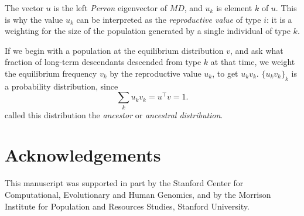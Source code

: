 \documentclass[9pt, a4paper, twocolumn]{extarticle}   	%
\newcommand*{\tr}{^\intercal}
\begin{document}
The vector $u$ is the left \emph{Perron} eigenvector of $MD$, and $u_k$ is element $k$ of $u$.
This is why the value $u_k$ can be interpreted as the \emph{reproductive value} of type $i$: it is a weighting for the size of the population generated by a single individual of type $k$.

If we begin with a population at the equilibrium distribution $v$,
and ask what fraction of long-term descendants descended from type $k$ at that time,
we weight the equilibrium frequency $v_k$ by the reproductive value $u_k$, to get $u_k v_k$.
$\{u_k v_k\}_{k}$ is a probability distribution, since
\begin{equation}
\sum_k {u_k v_k} = u\tr v = 1.
\end{equation}
\citet{Hermisson2002} called this distribution the \emph{ancestor} or \emph{ancestral distribution}.

{\small
\section*{Acknowledgements}

This manuscript was supported in part by the Stanford Center for Computational, Evolutionary and Human Genomics, and by the Morrison Institute for Population and Resources Studies, Stanford University.
}



\end{document}
